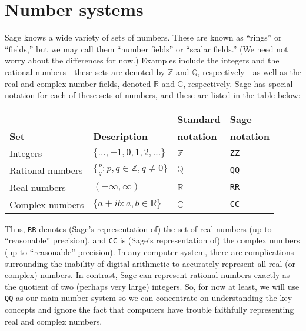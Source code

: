 \documentclass[fleqn,11pt]{paper}
\theoremstyle{remark}
\newcommand\R{\fld{R}}
\newcommand\Z{\fld{Z}}
\newcommand\C{\fld{C}}
\newcommand\Q{\fld{Q}}
\newcommand{\<}{\ensuremath{\langle}}
\renewcommand{\>}{\ensuremath{\rangle}}
\newcommand\fld[1]{\ensuremath{\mathbb{#1}}}
\begin{document}
\section{Number systems}
\label{sec:number-systems}
Sage knows a wide variety of sets of numbers. These are known as ``rings'' or
``fields,'' but we may call them ``number fields'' or ``scalar fields.''  (We
need not worry about the differences for now.)
Examples include the integers and the rational numbers---these sets are denoted
by $\Z$ and $\Q$, respectively---as well as the real and complex number fields,
denoted $\R$ and $\C$, respectively.  Sage has special notation for each of
these sets of numbers, and these are listed in the table below:

\begin{center}
\begin{tabular}{|l|l|l|l|}
  \hline
  &&{\bf Standard} & {\bf Sage}\\
  {\bf Set} & {\bf Description} & {\bf notation} & {\bf notation} \\[4pt]
  \hline
  Integers & $\{\dots, -1, 0, 1, 2, \dots\}$& $\Z$ & {\tt ZZ} \\[4pt]
  \hline
  Rational numbers & $\{\frac{p}{q} : p, q \in \Z, q \neq 0\}$ & $\Q$ & {\tt QQ} \\[4pt] 
  \hline
  Real numbers &  $(-\infty, \infty)$ & $\R$ & {\tt RR} \\[4pt] 
  \hline
  Complex numbers & $\{a + ib : a, b \in \R\}$ &  $\C$ & {\tt CC}\\[4pt]
  \hline
\end{tabular}
\end{center}

Thus, {\tt RR} denotes (Sage's representation of) the set of real numbers (up to
``reasonable'' precision), and {\tt CC} is (Sage's representation of) the complex
numbers (up to ``reasonable'' precision).  In any computer
system, there are complications surrounding the inability of digital
arithmetic to accurately represent all real (or complex) numbers. In contrast,
Sage can represent rational numbers exactly as the quotient of two (perhaps very
large) integers.  So, for now at least, we will use {\tt QQ} as our main number system
so we can concentrate on understanding the key concepts and ignore the fact that
computers have trouble faithfully representing real and complex numbers.
\end{document}
